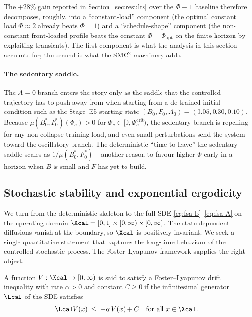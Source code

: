 The $+28\%$ gain reported in Section~\ref{sec:results} over the
$\Phi \equiv 1$ baseline therefore decomposes, roughly, into a
``constant-load'' component (the optimal constant load $\Phi \approx 2$
already beats $\Phi=1$) and a ``schedule-shape'' component (the
non-constant front-loaded profile beats the constant
$\Phi = \Phi_{\mathrm{opt}}$ on the finite horizon by exploiting
transients). The first component is what the analysis in this
section accounts for; the second is what the SMC${}^2$ machinery
adds.

\paragraph{The sedentary saddle.} The $A=0$ branch enters the story
only as the saddle that the controlled trajectory has to push away
from when starting from a de-trained initial condition such as the
Stage~E5 starting state $(B_0,F_0,A_0) = (0.05,0.30,0.10)$. Because
$\mu(B^*_0,F^*_0)(\Phi_c) > 0$ for $\Phi_c \in [0,\Phi_c^{\mathrm{crit}})$,
the sedentary branch is repelling for any non-collapse training
load, and even small perturbations send the system toward the
oscillatory branch. The deterministic ``time-to-leave'' the
sedentary saddle scales as $1/\mu(B^*_0,F^*_0)$ -- another reason
to favour higher $\Phi$ early in a horizon when $B$ is small and
$F$ has yet to build.

\subsection{Stochastic stability and exponential ergodicity}\label{sec:lyap-stoch}

We turn from the deterministic skeleton to the full SDE
\eqref{eq:fsa-B}--\eqref{eq:fsa-A} on the operating domain
$\Xcal = [0,1] \times [0,\infty) \times [0,\infty)$. The
state-dependent diffusions vanish at the boundary, so $\Xcal$ is
positively invariant. We seek a single quantitative statement that
captures the long-time behaviour of the controlled stochastic
process. The Foster--Lyapunov framework supplies the right object.

\begin{definition}\label{def:foster-lyap}
A function $V:\Xcal \to [0,\infty)$ is said to satisfy a
Foster--Lyapunov drift inequality with rate $\alpha > 0$ and
constant $C \ge 0$ if the infinitesimal generator $\Lcal$ of the
SDE satisfies
\begin{equation}
  \Lcal V(x) \;\le\; -\alpha\,V(x) + C
  \quad\text{for all } x \in \Xcal.
  \label{eq:foster-lyap}
\end{equation}
\end{definition}


